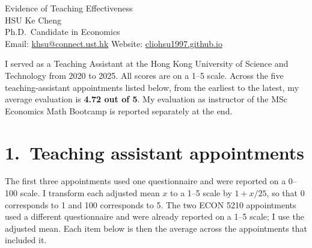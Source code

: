 \documentclass[11pt]{article}
\begin{document}
\begin{center}
{\Large Evidence of Teaching Effectiveness}\\[0.4em]
HSU Ke Cheng\\
Ph.D.\ Candidate in Economics\\[0.2em]
{\small Email: \href{mailto:khsu@connect.ust.hk}{khsu@connect.ust.hk}
\quad Website: \href{https://cliohsu1997.github.io/}{cliohsu1997.github.io}}
\end{center}

I served as a Teaching Assistant at the Hong Kong University of Science and Technology from 2020 to 2025. All scores are on a 1--5 scale. Across the five teaching-assistant appointments listed below, from the earliest to the latest, my average evaluation is \textbf{4.72 out of 5}. My evaluation as instructor of the MSc Economics Math Bootcamp is reported separately at the end.

\section*{1.\ Teaching assistant appointments}

The first three appointments used one questionnaire and were reported on a 0--100 scale. I transform each adjusted mean \(x\) to a 1--5 scale by \(1 + x/25\), so that 0 corresponds to 1 and 100 corresponds to 5. The two ECON 5210 appointments used a different questionnaire and were already reported on a 1--5 scale; I use the adjusted mean. Each item below is then the average across the appointments that included it.
\end{document}
